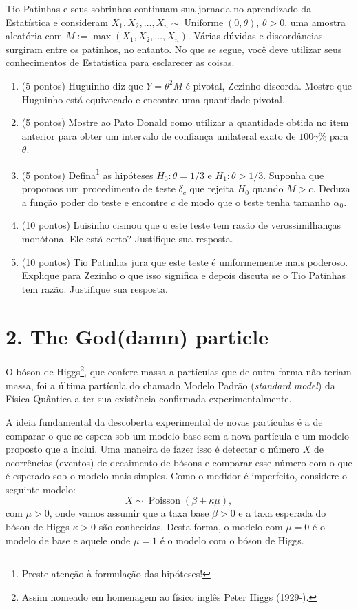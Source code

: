 \documentclass[a4paper,10pt, notitlepage]{report}
\newcommand{\rs}{X_1, X_2, \ldots, X_n} %
\begin{document}
Tio Patinhas e seus sobrinhos continuam sua jornada no aprendizado da Estatística e  consideram  $\rs \sim \operatorname{Uniforme}(0, \theta)$, $\theta > 0$, uma amostra aleatória com $M := \max(\rs)$.
Várias dúvidas e discordâncias surgiram entre os patinhos, no entanto. 
No que se segue, você deve utilizar seus conhecimentos de Estatística para esclarecer as coisas.


\begin{enumerate}[label=\alph*)]
\item (5 pontos) Huguinho diz que $Y = \theta^2 M$ é pivotal, Zezinho discorda.
Mostre que Huguinho está equivocado e encontre uma quantidade pivotal.
 \item (5 pontos) Mostre ao Pato Donald como utilizar a quantidade obtida no item anterior para obter um intervalo de confiança unilateral exato de $100\gamma \%$ para $\theta$. 
 \item (5 pontos) Defina\footnote{Preste atenção à formulação das hipóteses!} as hipóteses $H_0: \theta = 1/3$ e $H_1: \theta > 1/3$. 
Suponha que propomos um  procedimento de teste $\delta_c$ que rejeita $H_0$ quando $M > c$.
Deduza a função poder do teste e encontre $c$ de modo que o teste tenha tamanho $\alpha_0$.
 \item (10 pontos) Luisinho cismou que o  este teste tem razão de verossimilhanças monótona. 
 Ele está certo?
 Justifique sua resposta.
  \item (10 pontos) Tio Patinhas jura que este teste é uniformemente mais poderoso.
  Explique para Zezinho o que isso significa e depois discuta se o Tio Patinhas tem razão.
  Justifique sua resposta.
\end{enumerate}

\section*{2. The God(damn) particle}

O bóson de Higgs\footnote{Assim nomeado em homenagem ao físico inglês Peter Higgs (1929-).}, que confere massa a partículas que de outra forma não teriam massa, foi a última partícula do chamado Modelo Padrão (\textit{standard model}) da Física Quântica a ter sua existência confirmada experimentalmente.

A ideia fundamental da descoberta experimental de novas partículas é a de comparar o que se espera sob um modelo base sem a nova partícula e um modelo proposto que a inclui.
Uma maneira de fazer isso é detectar o número $X$ de ocorrências (eventos) de decaimento de bósons e comparar esse número com o que é esperado sob o modelo mais simples.
Como o medidor é imperfeito, considere o seguinte modelo:
\begin{equation*}
 X \sim \operatorname{Poisson}(\beta  + \kappa\mu),
\end{equation*}
com $\mu >0$, onde vamos assumir que a taxa base $\beta > 0$ e a taxa esperada do bóson de Higgs $\kappa >0$ são conhecidas.
Desta forma, o modelo com $\mu = 0$ é o modelo de base e aquele onde $\mu =1$ é o modelo com o bóson de Higgs.
\end{document}
